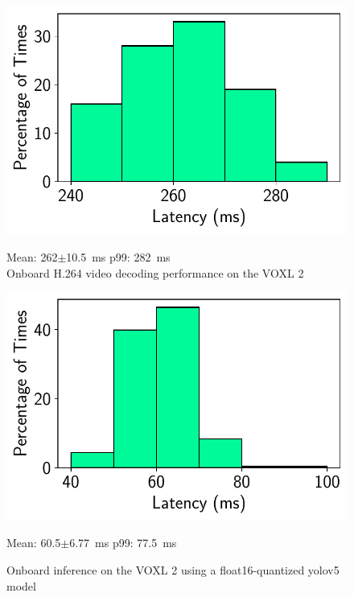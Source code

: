 \begin{figure}[tbp]
\begin{minipage}[t]{0.45\textwidth}
\centerline{\includegraphics[width = \textwidth]{figs/onboard-decoding.pdf}}
\centering
Mean: 262$\pm$10.5~ms\; p99: 282~ms\\
\caption{Onboard H.264 video decoding performance on the VOXL 2}
\label{fig:voxl2-decoding-performance}
\end{minipage}
\hfill
\begin{minipage}[t]{0.45\textwidth}
\centerline{\includegraphics[width = \textwidth]{figs/onboard-inference-hist.pdf}}
\centering
Mean: 60.5$\pm$6.77~ms\; p99: 77.5~ms\\
\caption{Onboard inference on the VOXL 2 using a float16-quantized yolov5 model}
\label{fig:voxl2-inference-hist}
\end{minipage}
\end{figure}
